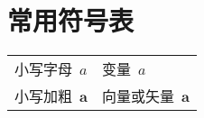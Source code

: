 \chapter{常用符号表}
\begin{tabular}{ll}
	小写字母~$a$          & 变量~$a$                   \\
	小写加粗~$\mathbf{a}$ & 向量或矢量~$\mathbf{a}$
\end{tabular}
